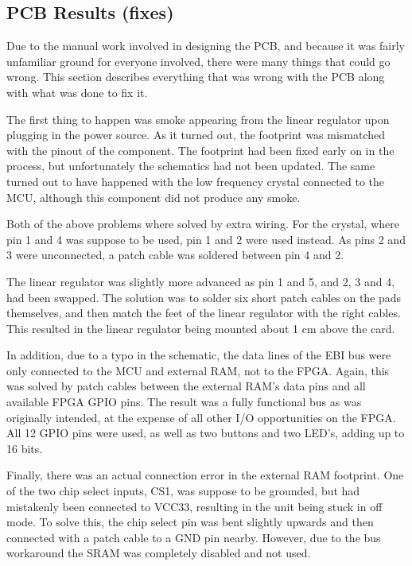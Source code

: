 
\subsection{PCB Results (fixes)}

Due to the manual work involved in designing the PCB, and because it was fairly
unfamiliar ground for everyone involved, there were many things that could go
wrong. This section describes everything that was wrong with the PCB along with
what was done to fix it.

The first thing to happen was smoke appearing from the linear regulator upon
plugging in the power source. As it turned out, the footprint was mismatched
with the pinout of the component. The footprint had been fixed early on in the
process, but unfortunately the schematics had not been updated. The same turned
out to have happened with the low frequency crystal connected to the MCU,
although this component did not produce any smoke.

Both of the above problems where solved by extra wiring. For the crystal, where
pin 1 and 4 was suppose to be used, pin 1 and 2 were used instead. As pins 2 and
3 were unconnected, a patch cable was soldered between pin 4 and 2.




The linear regulator was slightly more advanced as pin 1 and 5, and 2, 3 and 4,
had been swapped. The solution was to solder six short patch cables on the pads
themselves, and then match the feet of the linear regulator with the right
cables. This resulted in the linear regulator being mounted about 1 cm above the
card.




In addition, due to a typo in the schematic, the data lines of the EBI bus were
only connected to the MCU and external RAM, not to the FPGA. Again, this was
solved by patch cables between the external RAM's data pins and all available
FPGA GPIO pins. The result was a fully functional bus as was originally
intended, at the expense of all other I/O opportunities on the FPGA. All 12 GPIO
pins were used, as well as two buttons and two LED's, adding up to 16 bits.




Finally, there was an actual connection error in the external RAM footprint.
One of the two chip select inputs, CS1, was suppose to be grounded, but had
mistakenly been connected to VCC33, resulting in the unit being stuck in off
mode. To solve this, the chip select pin was bent slightly upwards and then
connected with a patch cable to a GND pin nearby. However, due to the bus
workaround the SRAM was completely disabled and not used.

